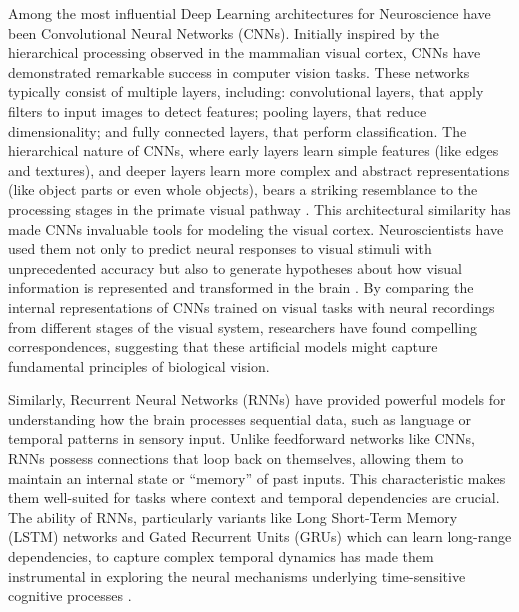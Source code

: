 Among the most influential Deep Learning architectures for Neuroscience have been Convolutional Neural Networks (CNNs). Initially inspired by the hierarchical processing observed in the mammalian visual cortex, CNNs have demonstrated remarkable success in computer vision tasks. These networks typically consist of multiple layers, including: convolutional layers, that apply filters to input images to detect features; pooling layers, that reduce dimensionality; and fully connected layers, that perform classification. The hierarchical nature of CNNs, where early layers learn simple features (like edges and textures), and deeper layers learn more complex and abstract representations (like object parts or even whole objects), bears a striking resemblance to the processing stages in the primate visual pathway \cite{yamins2016using}. This architectural similarity has made CNNs invaluable tools for modeling the visual cortex. Neuroscientists have used them not only to predict neural responses to visual stimuli with unprecedented accuracy but also to generate hypotheses about how visual information is represented and transformed in the brain \cite{kriegeskorte2018cognitive, savage2019how}. By comparing the internal representations of CNNs trained on visual tasks with neural recordings from different stages of the visual system, researchers have found compelling correspondences, suggesting that these artificial models might capture fundamental principles of biological vision.

Similarly, Recurrent Neural Networks (RNNs) have provided powerful models for understanding how the brain processes sequential data, such as language or temporal patterns in sensory input. Unlike feedforward networks like CNNs, RNNs possess connections that loop back on themselves, allowing them to maintain an internal state or ``memory'' of past inputs. This characteristic makes them well-suited for tasks where context and temporal dependencies are crucial. The ability of RNNs, particularly variants like Long Short-Term Memory (LSTM) networks and Gated Recurrent Units (GRUs) which can learn long-range dependencies, to capture complex temporal dynamics has made them instrumental in exploring the neural mechanisms underlying time-sensitive cognitive processes \cite{richards2019deep}.

\clearpage